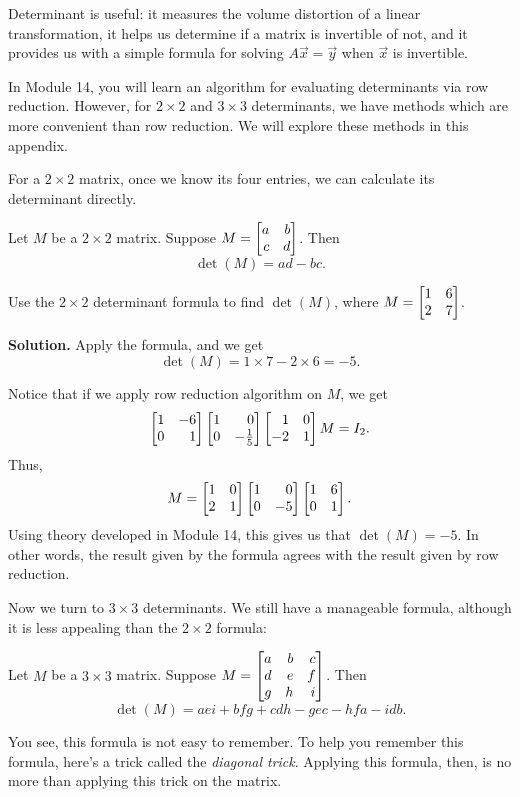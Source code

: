 Determinant is useful: it measures the volume distortion of a linear transformation, it helps us determine if a matrix is invertible of not, and it provides us with a simple formula for solving \(A\vec x=\vec y\) when \(\vec x\) is invertible.

In Module 14, you will learn an algorithm for evaluating determinants via row reduction. However, for \(2\times 2\) and \(3\times 3\) determinants, we have methods which are more convenient than row reduction. We will explore these methods in this appendix.

For a \(2\times 2\) matrix, once we know its four entries, we can calculate its determinant directly.
\begin{theorem}
  Let \(M\) be a \(2\times 2\) matrix. Suppose \(M=\mat{a & b \\ c & d}\). Then \[\det(M)=ad-bc.\]
\end{theorem}
\begin{example}
Use the \(2\times 2\) determinant formula to find \(\det(M)\), where \(M=\mat{1 & 6 \\ 2  & 7}\).
\end{example}
\textbf{Solution. }Apply the formula, and we get \[\det(M)=1\times 7-2\times 6=-5.\]

Notice that if we apply row reduction algorithm on \(M\), we get \[\mat{1 & -6 \\ 0 & 1}\mat{1 & 0 \\ 0 & -\frac{1}{5}}\mat{1 & 0 \\ -2 & 1}M=I_{2}.\]
Thus, \[M=\mat{1 & 0 \\ 2 & 1}\mat{1 & 0 \\ 0 & -5}\mat{1 & 6 \\ 0 & 1}.\]
Using theory developed in Module 14, this gives us that \(\det(M)=-5\). In other words, the result given by the formula agrees with the result given by row reduction.

Now we turn to \(3\times 3\) determinants. We still have a manageable formula, although it is less appealing than the \(2\times 2\) formula:
\begin{theorem}
  Let \(M\) be a \(3\times 3\) matrix. Suppose \(M=\mat{a & b & c \\ d & e & f \\ g & h & i}\). Then \[\det(M)=aei+bfg+cdh-gec-hfa-idb.\]
\end{theorem}
You see, this formula is not easy to remember. To help you remember this formula, here's a trick called the \textit{diagonal trick}. Applying this formula, then, is no more than applying this trick on the matrix.

